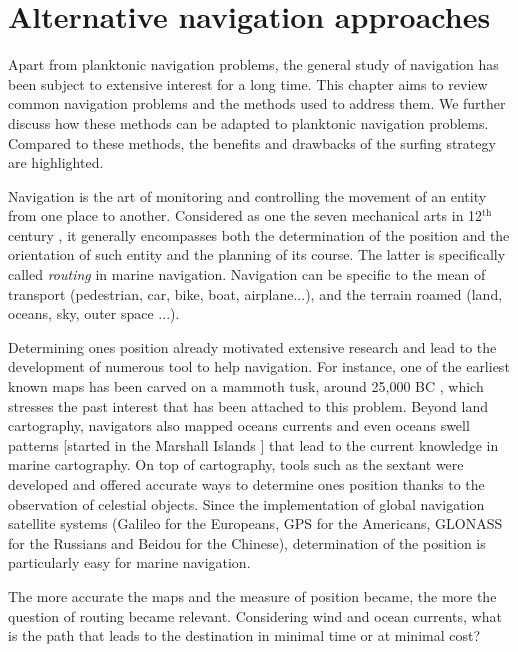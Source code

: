 \chapter{Alternative navigation approaches}\label{chap:navigation}

Apart from planktonic navigation problems, the general study of navigation has been subject to extensive interest for a long time. 
This chapter aims to review common navigation problems and the methods used to address them.
We further discuss how these methods can be adapted to planktonic navigation problems.
Compared to these methods, the benefits and drawbacks of the surfing strategy are highlighted.

Navigation is the art of monitoring and controlling the movement of an entity from one place to another.
Considered as one the seven mechanical arts in 12$^{\mathrm{th}}$ century \citep{taylor1961didascalicon, stahl1971martianus}, it generally encompasses both the determination of the position and the orientation of such entity and the planning of its course.
The latter is specifically called \textit{routing} in marine navigation.
Navigation can be specific to the mean of transport (pedestrian, car, bike, boat, airplane...), and the terrain roamed (land, oceans, sky, outer space ...).

Determining ones position already motivated extensive research and lead to the development of numerous tool to help navigation.
For instance, one of the earliest known maps has been carved on a mammoth tusk, around 25,000 BC \citep{wolodtschenko2007prehistoric}, which stresses the past interest that has been attached to this problem.
Beyond land cartography, navigators also mapped oceans currents and even oceans swell patterns [started in the Marshall Islands \citep{bagrow2017history}] that lead to the current knowledge in marine cartography.
On top of cartography, tools such as the sextant were developed and offered accurate ways to determine ones position thanks to the observation of celestial objects.
Since the implementation of global navigation satellite systems (Galileo for the Europeans, GPS for the Americans, GLONASS for the Russians and Beidou for the Chinese), determination of the position is particularly easy for marine navigation.

The more accurate the maps and the measure of position became, the more the question of routing became relevant.
Considering wind and ocean currents, what is the path that leads to the destination in minimal time or at minimal cost?

